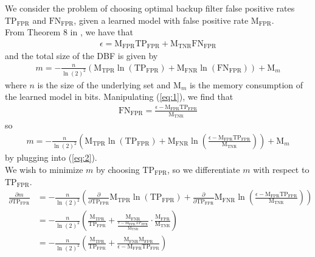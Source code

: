 \documentclass{article}
\begin{document}
We consider the problem of choosing optimal backup filter false positive rates $\text{TP}_\text{FPR}$ and $\text{FN}_\text{FPR}$, given a learned model with false positive rate $\text{M}_\text{FPR}$. \\

\noindent
From Theorem 8 in \cite{bishop_tirmazi_2025}, we have that 
\begin{align}
    \label{eq:1}
    \epsilon = \text{M}_\text{FPR} \text{TP}_\text{FPR} + \text{M}_\text{TNR} \text{FN}_\text{FPR} 
\end{align}
and the total size of the DBF is given by 
\begin{align}
    \label{eq:2}
    m = - \frac{n}{\ln(2)^2}\left( \text{M}_\text{TPR} \ln(\text{TP}_\text{FPR}) + \text{M}_\text{FNR} \ln(\text{FN}_\text{FPR})  \right) + \text{M}_m
\end{align}
where $n$ is the size of the underlying set and $\text{M}_m$ is the memory consumption of the learned model in bits. Manipulating (\ref{eq:1}), we find that
\begin{align}
    \label{eq:3}
    \text{FN}_\text{FPR} = \frac{\epsilon - \text{M}_\text{FPR} \text{TP}_\text{FPR}}{\text{M}_\text{TNR}} 
\end{align}
so 
\begin{align}
    m = - \frac{n}{\ln(2)^2}\left( \text{M}_\text{TPR} \ln(\text{TP}_\text{FPR}) + \text{M}_\text{FNR} \ln\left(\frac{\epsilon - \text{M}_\text{FPR} \text{TP}_\text{FPR}}{\text{M}_\text{TNR}} \right)  \right) + \text{M}_m
\end{align}
by plugging into (\ref{eq:2}). \\

\noindent
We wish to minimize $m$ by choosing $\text{TP}_\text{FPR}$, so we differentiate $m$ with respect to $\text{TP}_\text{FPR}$.
\begin{align}
    \frac{\partial m}{\partial \text{TP}_\text{FPR}} 
    &= -\frac{n}{\ln(2)^2}\left( \frac{\partial}{\partial \text{TP}_\text{FPR}} \text{M}_\text{TPR} \ln(\text{TP}_\text{FPR})
        + \frac{\partial}{\partial \text{TP}_\text{FPR}} \text{M}_\text{FNR} \ln\left(\frac{\epsilon - \text{M}_\text{FPR} \text{TP}_\text{FPR}}{\text{M}_\text{TNR}} \right) \right) \\
    &= - \frac{n}{\ln(2)^2} \left( \frac{\text{M}_\text{TPR}} {\text{TP}_\text{FPR}} + \frac{\text{M}_\text{FNR}}{\frac{\epsilon - \text{M}_\text{FPR} \text{TP}_\text{FPR}}{\text{M}_\text{TNR}}} \cdot \frac{\text{M}_\text{FPR}}{\text{M}_\text{TNR}} \right) \\
    &= - \frac{n}{\ln(2)^2} \left( \frac{\text{M}_\text{TPR}} {\text{TP}_\text{FPR}} + \frac{\text{M}_\text{FNR}\text{M}_\text{FPR}}{\epsilon - \text{M}_\text{FPR} \text{TP}_\text{FPR}}\right) \\
\end{align}
\end{document}
